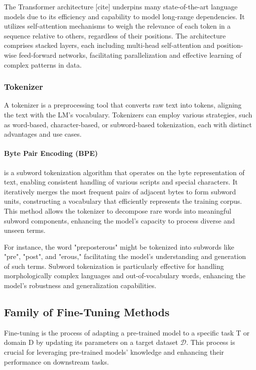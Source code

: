 \documentclass[11pt, onecolumn]{article}
\newcounter{para}
\begin{document}
The Transformer architecture [cite] underpins many state-of-the-art language models due to its efficiency and capability to model long-range dependencies. It utilizes self-attention mechanisms to weigh the relevance of each token in a sequence relative to others, regardless of their positions. The architecture comprises stacked layers, each including multi-head self-attention and position-wise feed-forward networks, facilitating parallelization and effective learning of complex patterns in data.

\subsubsection{Tokenizer} \label{sec:pre-tokenizer}

A tokenizer is a preprocessing tool that converts raw text into tokens, aligning the text with the LM's vocabulary. Tokenizers can employ various strategies, such as word-based, character-based, or subword-based tokenization, each with distinct advantages and use cases.

\paragraph{Byte Pair Encoding (BPE)} is a subword tokenization algorithm that operates on the byte representation of text, enabling consistent handling of various scripts and special characters. It iteratively merges the most frequent pairs of adjacent bytes to form subword units, constructing a vocabulary that efficiently represents the training corpus. This method allows the tokenizer to decompose rare words into meaningful subword components, enhancing the model's capacity to process diverse and unseen terms.

For instance, the word "preposterous" might be tokenized into subwords like "pre", "post", and "erous," facilitating the model's understanding and generation of such terms. Subword tokenization is particularly effective for handling morphologically complex languages and out-of-vocabulary words, enhancing the model's robustness and generalization capabilities.


\subsection{Family of Fine-Tuning Methods}
Fine-tuning is the process of adapting a pre-trained model to a specific task T or domain D by updating its parameters on a target dataset \(\mathcal{D}\). This process is crucial for leveraging pre-trained models' knowledge and enhancing their performance on downstream tasks.
\end{document}
